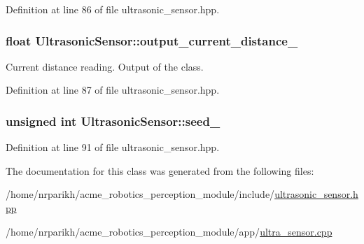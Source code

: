 Definition at line 86 of file ultrasonic\+\_\+sensor.\+hpp.

\subsubsection[{\texorpdfstring{output\+\_\+current\+\_\+distance\+\_\+}{output_current_distance_}}]{\setlength{\rightskip}{0pt plus 5cm}float Ultrasonic\+Sensor\+::output\+\_\+current\+\_\+distance\+\_\+\hspace{0.3cm}{\ttfamily [private]}}\hypertarget{class_ultrasonic_sensor_a96a5d6ca72fcbe545ea88f504b24b44a}{}\label{class_ultrasonic_sensor_a96a5d6ca72fcbe545ea88f504b24b44a}
Current distance reading. Output of the class. 

Definition at line 87 of file ultrasonic\+\_\+sensor.\+hpp.

\subsubsection[{\texorpdfstring{seed\+\_\+}{seed_}}]{\setlength{\rightskip}{0pt plus 5cm}unsigned int Ultrasonic\+Sensor\+::seed\+\_\+\hspace{0.3cm}{\ttfamily [private]}}\hypertarget{class_ultrasonic_sensor_a3d7bb6ec05405169a0ea40432a79e318}{}\label{class_ultrasonic_sensor_a3d7bb6ec05405169a0ea40432a79e318}


Definition at line 91 of file ultrasonic\+\_\+sensor.\+hpp.



The documentation for this class was generated from the following files\+:\begin{DoxyCompactItemize}
\item 
/home/nrparikh/acme\+\_\+robotics\+\_\+perception\+\_\+module/include/\hyperlink{ultrasonic__sensor_8hpp}{ultrasonic\+\_\+sensor.\+hpp}\item 
/home/nrparikh/acme\+\_\+robotics\+\_\+perception\+\_\+module/app/\hyperlink{ultra__sensor_8cpp}{ultra\+\_\+sensor.\+cpp}\end{DoxyCompactItemize}
